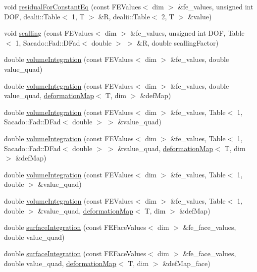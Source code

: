 \begin{DoxyCompactItemize}
\item 
void \mbox{\hyperlink{class_residual_a5d0f09e08ac7a6603bab9f192fd3c109}{residual\+For\+Constant\+Eq}} (const F\+E\+Values$<$ dim $>$ \&fe\+\_\+values, unsigned int D\+OF, dealii\+::\+Table$<$ 1, T $>$ \&R, dealii\+::\+Table$<$ 2, T $>$ \&value)
\item 
void \mbox{\hyperlink{class_residual_a339d8e3f5d146ad54951896c5f1e3d19}{scalling}} (const F\+E\+Values$<$ dim $>$ \&fe\+\_\+values, unsigned int D\+OF, Table$<$ 1, Sacado\+::\+Fad\+::\+D\+Fad$<$ double $>$ $>$ \&R, double scalling\+Factor)
\item 
double \mbox{\hyperlink{class_residual_a8ac0b75533aa9e599cc3c623e57fa5aa}{volume\+Integration}} (const F\+E\+Values$<$ dim $>$ \&fe\+\_\+values, double value\+\_\+quad)
\item 
double \mbox{\hyperlink{class_residual_ad535764375d2690424b1545898b8a168}{volume\+Integration}} (const F\+E\+Values$<$ dim $>$ \&fe\+\_\+values, double value\+\_\+quad, \mbox{\hyperlink{structdeformation_map}{deformation\+Map}}$<$ T, dim $>$ \&def\+Map)
\item 
double \mbox{\hyperlink{class_residual_ab9fdc6a8b102af5beaa1e4eb6fb7fa40}{volume\+Integration}} (const F\+E\+Values$<$ dim $>$ \&fe\+\_\+values, Table$<$ 1, Sacado\+::\+Fad\+::\+D\+Fad$<$ double $>$ $>$ \&value\+\_\+quad)
\item 
double \mbox{\hyperlink{class_residual_a50acc2c1f154889f83606a2b2e2d555c}{volume\+Integration}} (const F\+E\+Values$<$ dim $>$ \&fe\+\_\+values, Table$<$ 1, Sacado\+::\+Fad\+::\+D\+Fad$<$ double $>$ $>$ \&value\+\_\+quad, \mbox{\hyperlink{structdeformation_map}{deformation\+Map}}$<$ T, dim $>$ \&def\+Map)
\item 
double \mbox{\hyperlink{class_residual_a734c1bb6a4a56aa1c774485441e47340}{volume\+Integration}} (const F\+E\+Values$<$ dim $>$ \&fe\+\_\+values, Table$<$ 1, double $>$ \&value\+\_\+quad)
\item 
double \mbox{\hyperlink{class_residual_ae097f5d9f2a92108cb0a1c7ecf4510c3}{volume\+Integration}} (const F\+E\+Values$<$ dim $>$ \&fe\+\_\+values, Table$<$ 1, double $>$ \&value\+\_\+quad, \mbox{\hyperlink{structdeformation_map}{deformation\+Map}}$<$ T, dim $>$ \&def\+Map)
\item 
double \mbox{\hyperlink{class_residual_ac48cd0a04f0d2f91a23e60135652d938}{surface\+Integration}} (const F\+E\+Face\+Values$<$ dim $>$ \&fe\+\_\+face\+\_\+values, double value\+\_\+quad)
\item 
double \mbox{\hyperlink{class_residual_ad44c10c32c915ba9b431c0256a2769c2}{surface\+Integration}} (const F\+E\+Face\+Values$<$ dim $>$ \&fe\+\_\+face\+\_\+values, double value\+\_\+quad, \mbox{\hyperlink{structdeformation_map}{deformation\+Map}}$<$ T, dim $>$ \&def\+Map\+\_\+face)

\end{DoxyCompactItemize}
